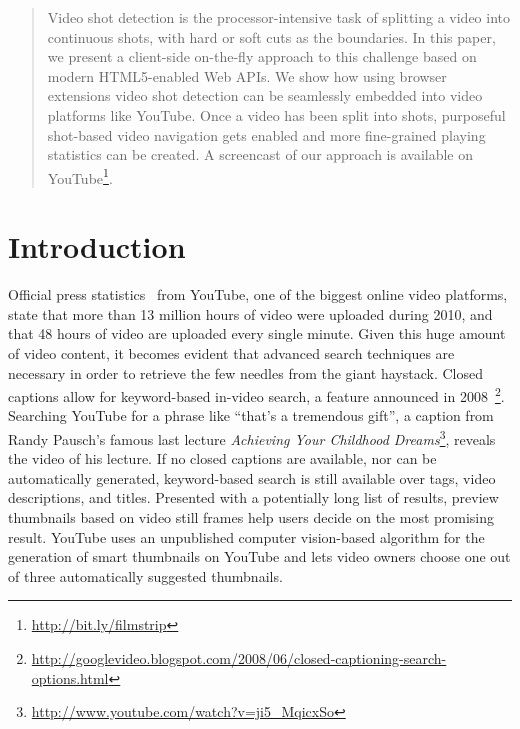 \documentclass{acm_proc_article-sp}
\newcommand{\inlinelistingsize}{\fontsize{8pt}{11pt}}
\let\oldurl\url
\renewcommand{\url}[1]{\inlinelistingsize\oldurl{#1}}
\begin{document}
\begin{abstract}
Video shot detection is the processor-intensive task of splitting a video into continuous shots, with hard or soft cuts as the boundaries. In this paper, we present a client-side on-the-fly approach to this challenge based on modern HTML5-enabled Web APIs. We show how using browser extensions video shot detection can be seamlessly embedded into video platforms like YouTube. Once a video has been split into shots, purposeful shot-based video navigation gets enabled and more fine-grained playing statistics can be created.
A screencast of our approach is available on YouTube\footnote{\url{http://bit.ly/filmstrip}}.
\end{abstract}




\section{Introduction}
Official press statistics~\cite{youtube:stats} from YouTube, one of the biggest online video platforms, state that more than 13 million hours of video were uploaded during 2010, and that 48 hours of video are uploaded every single minute. Given this huge amount of video content, it becomes evident that advanced search techniques are necessary in order to retrieve the few needles from the giant haystack. Closed captions allow for keyword-based in-video search, a feature announced in 2008~\footnote{\url{http://googlevideo.blogspot.com/2008/06/closed-captioning-search-options.html}}. Searching YouTube for a phrase like ``that's a tremendous gift'', a caption from Randy Pausch's famous last lecture \emph{Achieving Your Childhood Dreams}\footnote{\url{http://www.youtube.com/watch?v=ji5\_MqicxSo}}, reveals the video of his lecture. If no closed captions are available, nor can be automatically generated, keyword-based search is still available over tags, video descriptions, and titles. Presented with a potentially long list of results, preview thumbnails based on video still frames help users decide on the most promising result. YouTube uses an unpublished computer vision-based algorithm for the generation of smart thumbnails on YouTube and lets video owners choose one out of three automatically suggested thumbnails.
\end{document}
